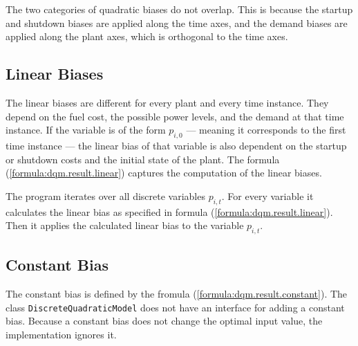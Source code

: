 The two categories of quadratic biases do not overlap.
This is because the startup and shutdown biases are applied along the time axes,
and the demand biases are applied along the plant axes, which is orthogonal to the time axes.

\subsection*{Linear Biases}

The linear biases are different for every plant and every time instance.
They depend on the fuel cost, the possible power levels, and the demand at that time instance.
If the variable is of the form $p_{i, 0}$ --- meaning it corresponds to the first time instance --- the linear bias of that variable is also dependent on the startup or shutdown costs and the initial state of the plant.
The formula (\ref{formula:dqm.result.linear}) captures the computation of the linear biases.

The program iterates over all discrete variables $p_{i, t}$.
For every variable it calculates the linear bias as specified in formula (\ref{formula:dqm.result.linear}).
Then it applies the calculated linear bias to the variable $p_{i, t}$.

\subsection*{Constant Bias}

The constant bias is defined by the fromula (\ref{formula:dqm.result.constant}).
The class \texttt{DiscreteQuadraticModel} does not have an interface for adding a constant bias.
Because a constant bias does not change the optimal input value, the implementation ignores it.
